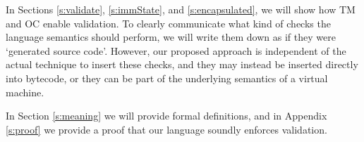 In Sections \ref{s:validate}, \ref{s:immState}, and \ref{s:encapsulated}, we will show how TM and OC enable validation.
To clearly communicate what kind of checks the language semantics should perform,
 we will write them down as if they were `generated source code'.
However, our proposed approach is independent of the actual technique to insert these checks, and they may instead be inserted directly into bytecode, or they can be part of the underlying semantics of a virtual machine.

In Section \ref{s:meaning} we will provide formal definitions, and in Appendix \ref{s:proof} we provide  a proof that our language soundly enforces validation.




